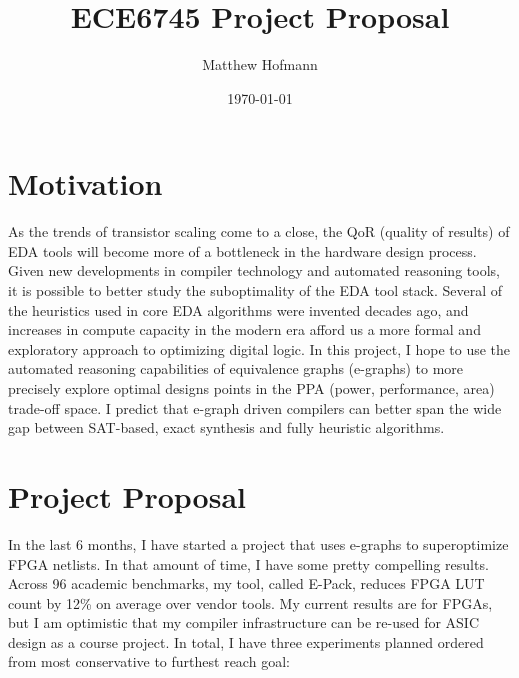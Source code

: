 \documentclass[10pt,letterpaper]{article}
\title{ECE6745 Project Proposal}
\author{Matthew Hofmann}
\date{\today}
\begin{document}
\maketitle

\section{Motivation}\label{sec:motivation}

As the trends of transistor scaling come to a close, the QoR (quality of
results) of EDA tools will become more of a bottleneck in the hardware design
process. Given new developments in compiler technology and automated reasoning
tools, it is possible to better study the suboptimality of the EDA tool stack.
Several of the heuristics used in core EDA algorithms were invented decades
ago, and increases in compute capacity in the modern era afford us a more
formal and exploratory approach to optimizing digital logic. In this project, I
hope to use the automated reasoning capabilities of equivalence graphs
(e-graphs) to more precisely explore optimal designs points in the PPA (power,
performance, area) trade-off space. I predict that e-graph driven compilers can
better span the wide gap between SAT-based, exact synthesis and fully heuristic
algorithms.

\section{Project Proposal}\label{sec:intro}

In the last 6 months, I have started a project that uses e-graphs to
superoptimize FPGA netlists. In that amount of time, I have some pretty
compelling results. Across 96 academic benchmarks, my tool, called E-Pack,
reduces FPGA LUT count by 12\% on average over vendor tools. My current results
are for FPGAs, but I am optimistic that my compiler infrastructure can be
re-used for ASIC design as a course project. In total, I have three experiments
planned ordered from most conservative to furthest reach goal:
\end{document}
